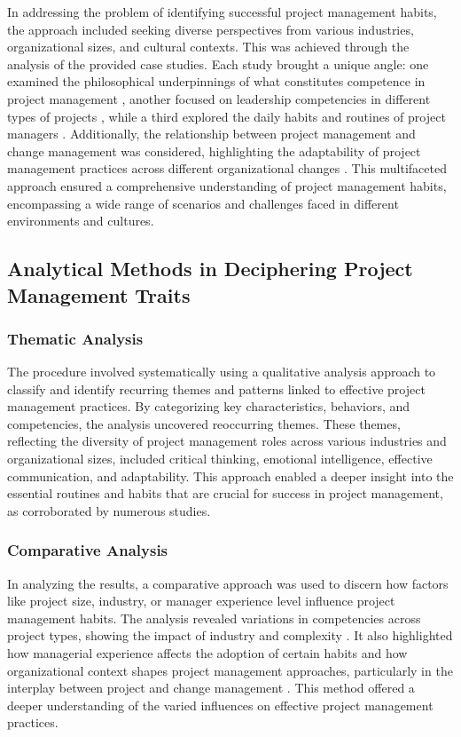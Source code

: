 \documentclass{article}
\begin{document}
In addressing the problem of identifying successful project management habits, the approach included seeking diverse perspectives from various industries, organizational sizes, and cultural contexts. This was achieved through the analysis of the provided case studies. Each study brought a unique angle: one examined the philosophical underpinnings of what constitutes competence in project management \cite{bredillet2015good}, another focused on leadership competencies in different types of projects \cite{muller2010leadership}, while a third explored the daily habits and routines of project managers \cite{sigurdhssonpatterns}. Additionally, the relationship between project management and change management was considered, highlighting the adaptability of project management practices across different organizational changes \cite{pollack2016project}. This multifaceted approach ensured a comprehensive understanding of project management habits, encompassing a wide range of scenarios and challenges faced in different environments and cultures.

\subsection{Analytical Methods in Deciphering Project Management Traits}

\subsubsection{Thematic Analysis}

The procedure involved systematically using a qualitative analysis approach to classify and identify recurring themes and patterns linked to effective project management practices. By categorizing key characteristics, behaviors, and competencies, the analysis uncovered reoccurring themes. These themes, reflecting the diversity of project management roles across various industries and organizational sizes, included critical thinking, emotional intelligence, effective communication, and adaptability. This approach enabled a deeper insight into the essential routines and habits that are crucial for success in project management, as corroborated by numerous studies.


\subsubsection{Comparative Analysis}

In analyzing the results, a comparative approach was used to discern how factors like project size, industry, or manager experience level influence project management habits. The analysis revealed variations in competencies across project types, showing the impact of industry and complexity \cite{muller2010leadership}. It also highlighted how managerial experience affects the adoption of certain habits \cite{sigurdhssonpatterns} and how organizational context shapes project management approaches, particularly in the interplay between project and change management \cite{pollack2016project}. This method offered a deeper understanding of the varied influences on effective project management practices.
\end{document}
